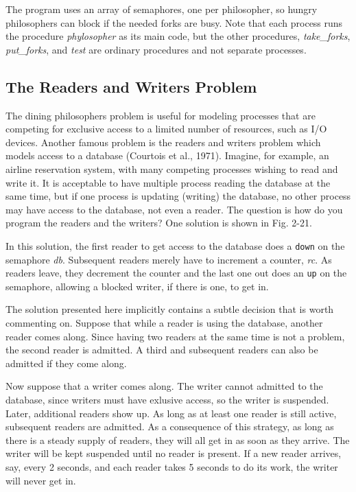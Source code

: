 \documentclass{book}
\newcommand {\sys} [1] {\textsl{#1}}
\newcommand {\cmd} [1] {\texttt{#1}}
\begin{document}
The program uses an array of semaphores, one per philosopher, so hungry philosophers can block if the needed forks are busy.
Note that each process runs the procedure \sys{phylosopher} as its main code, 
but the other procedures, \sys{take\_forks}, \sys{put\_forks}, and \sys{test} are ordinary procedures and not separate processes.

\subsection{The Readers and Writers Problem}
The dining philosophers problem is useful for modeling processes that are competing for exclusive access to a limited number of resources,
such as I/O devices.
Another famous problem is the readers and writers problem which models access to a database (Courtois et al., 1971).
Imagine, for example, an airline reservation system, with many competing processes wishing to read and write it.
It is acceptable to have multiple process reading the database at the same time, but if one process is updating (writing) the database,
no other process may have access to the database, not even a reader.
The question is how do you program the readers and the writers?
One solution is shown in Fig. 2-21.

In this solution, the first reader to get access to the database does a \cmd{down} on the semaphore \sys{db}.
Subsequent readers merely have to increment a counter, \sys{rc}.
As readers leave, they decrement the counter and the last one out does an \cmd{up} on the semaphore, allowing a blocked writer,
if there is one, to get in.

The solution presented here implicitly contains a subtle decision that is worth commenting on.
Suppose that while a reader is using the database, another reader comes along.
Since having two readers at the same time is not a problem, the second reader is admitted.
A third and subsequent readers can also be admitted if they come along.

Now suppose that a writer comes along.
The writer cannot admitted to the database, since writers must have exlusive access, so the writer is suspended.
Later, additional readers show up.
As long as at least one reader is still active, subsequent readers are admitted.
As a consequence of this strategy, as long as there is a steady supply of readers, they will all get in as soon as they arrive.
The writer will be kept suspended until no reader is present.
If a new reader arrives, say, every 2 seconds, and each reader takes 5 seconds to do its work, the writer will never get in.
\end{document}

